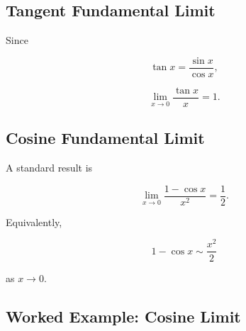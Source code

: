 \subsection{Tangent Fundamental Limit}
\label{subsec:tangent-fundamental-limit}

Since

\[
\tan x
=
\frac{\sin x}{\cos x},
\]

\[
\boxed{
\lim_{x\to0}
\frac{\tan x}{x}
=
1.
}
\]

\subsection{Cosine Fundamental Limit}
\label{subsec:cosine-fundamental-limit}

A standard result is

\[
\boxed{
\lim_{x\to0}
\frac{1-\cos x}{x^2}
=
\frac12.
}
\]

Equivalently,

\[
\boxed{
1-\cos x
\sim
\frac{x^2}{2}
}
\]

as \(x\to0\).

\subsection{Worked Example: Cosine Limit}
\label{subsec:worked-cosine-limit}


